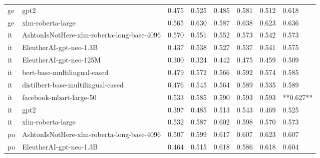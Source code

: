 \begin{tabular}{llllllll}
      ge &                                       gpt2 & 0.475 &                     0.525 &                 0.485 &                  0.581 &                                   0.512 &     0.618 \\
      ge &                          xlm-roberta-large & 0.565 &                     0.630 &                 0.587 &                  0.638 &                                   0.623 &     0.636 \\
      it & AshtonIsNotHere-xlm-roberta-long-base-4096 & 0.570 &                     0.551 &                 0.552 &                  0.573 &                                   0.542 &     0.573 \\
      it &                    EleutherAI-gpt-neo-1.3B & 0.437 &                     0.538 &                 0.527 &                  0.537 &                                   0.541 &     0.575 \\
      it &                    EleutherAI-gpt-neo-125M & 0.300 &                     0.324 &                 0.442 &                  0.475 &                                   0.459 &     0.509 \\
      it &               bert-base-multilingual-cased & 0.479 &                     0.572 &                 0.566 &                  0.592 &                                   0.574 &     0.585 \\
      it &         distilbert-base-multilingual-cased & 0.476 &                     0.545 &                 0.564 &                  0.589 &                                   0.535 &     0.589 \\
      it &                    facebook-mbart-large-50 & 0.533 &                     0.585 &                 0.590 &                  0.593 &                                   0.593 & **0.627** \\
      it &                                       gpt2 & 0.397 &                     0.485 &                 0.513 &                  0.543 &                                   0.469 &     0.525 \\
      it &                          xlm-roberta-large & 0.532 &                     0.587 &                 0.602 &                  0.598 &                                   0.570 &     0.573 \\
      po & AshtonIsNotHere-xlm-roberta-long-base-4096 & 0.507 &                     0.599 &                 0.617 &                  0.607 &                                   0.623 &     0.607 \\
      po &                    EleutherAI-gpt-neo-1.3B & 0.464 &                     0.515 &                 0.618 &                  0.586 &                                   0.618 &     0.604 \\

\end{tabular}
